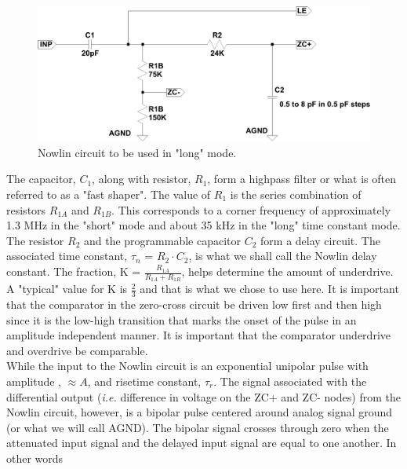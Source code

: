 \documentclass[12pt, onecolumn]{IEEEtran}
\begin{document}
\begin{figure}[htbp!]
	\centering
 	\includegraphics[scale=0.55,keepaspectratio=true]{./images/nowlin_long.pdf} 	
 	\caption{Nowlin circuit to be used in "long" mode.}
 	\label{FIG:NOWLIN_LONG}
\end{figure}


The capacitor, $C_1$, along with resistor, $R_1$, form a highpass filter or what is often referred to as a "fast shaper". The value of $R_1$ is the series combination of resistors $R_{1A}$ and $R_{1B}$. This corresponds to a corner frequency of approximately 1.3 MHz in the "short" mode and about 35 kHz in the "long" time constant mode. \\


The resistor $R_2$ and the programmable capacitor $C_2$ form a delay circuit. The associated time constant, $\tau_n$ = $R_2 \cdot C_2$, is what we shall call the Nowlin delay constant.  The fraction, K = $\frac{R_{1A}}{R_{1A} + R_{1B}}$, helps determine the amount of underdrive.  A "typical" value for K is $\frac{2}{3}$ and that is what we chose to use here. It is important that the comparator in the zero-cross circuit be driven low first and then high since it is the low-high transition that marks the onset of the pulse in an amplitude independent manner. It is important that the comparator underdrive and overdrive be comparable.\\ 


While the input to the Nowlin circuit is an exponential unipolar pulse with amplitude , $\approx A$, and risetime constant, $\tau_r$.  The signal associated with the differential output (\emph{i.e.} difference in voltage on the ZC+ and ZC- nodes) from the Nowlin circuit, however, is a bipolar pulse centered around analog signal ground (or what we will call AGND).  The bipolar signal crosses through zero when the attenuated input signal and the delayed input signal are equal to one another. In other words\\
\end{document}
